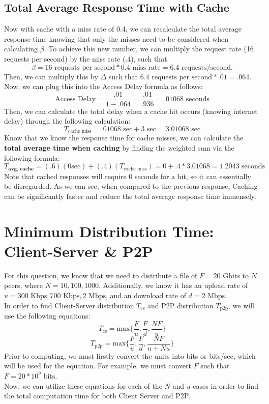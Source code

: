 \documentclass{article}
\begin{document}
\subsection{Total Average Response Time with Cache}
Now with cache with a miss rate of 0.4, we can recalculate the total average response time knowing that only the misses need to be considered when calculating $\beta$. To achieve this new number, we can multiply the request rate (16 requests per second) by the miss rate (.4), such that \
\[
\beta = 16 \text{ requests per second} * 0.4 \text{ miss rate} = 6.4 \text{ requests/second}. 
\]
Then, we can multiply this by $\Delta$ such that $6.4 \text{ requests per second} * .01 = .064$. Now, we can plug this into the Access Delay formula as follows:
\[
\text{Access Delay} = \frac{.01}{1 - .064} = \frac{.01}{.936} = .01068 \text{ seconds}
\]
Then, we can calculate the total delay when a cache hit occurs (knowing internet delay) through the following calculation:
\[
T_{\text{cache miss}} = .01068 \text{ sec}+ 3 \text{ sec} = 3.01068 \text{ sec}
\]
Know that we know the response time for cache misses, we can calculate the \textbf{total average time when caching} by finding the weighted sum via the following formula:
\[
T_{\textbf{avg, cache}} = (.6) (0 \text{sec}) + (.4) (T_{\text{cache miss}}) = 0 + .4 * 3.01068 = 1.2043 \text{ seconds}
\]
Note that cached responses will require 0 seconds for a hit, so it can essentially be disregarded. As we can see, when compared to the previous response, Caching can be significantly faster and reduce the total average response time immensely.

\setcounter{section}{21}
\section{Minimum Distribution Time: Client-Server \& P2P}
For this question, we know that we need to distribute a file of $F = 20 \text{ Gbits}$ to $N$ peers, where $N = 10, 100, 1000$. Additionally, we know it has an upload rate of $u = 300 \text{ Kbps}, 700 \text{ Kbps}, 2 \text{ Mbps}$, and an download rate of $d = 2 \text{ Mbps}$. \\
In order to find Client-Server distribution $T_{\text{cs}}$ and P2P distribution $T_{\text{p2p}}$, we will use the following equations:
\[
T_{\text{cs}} = \text{max}\{\frac{F}{u}, \frac{F}{d}, \frac{NF}{u} \} 
\]
\[
T_{\text{p2p}} = \text{max}\{\frac{F}{u}, \frac{F}{d}, \frac{NF}{u + Nu} \} 
\]
Prior to computing, we must firstly convert the units into bits or bits/sec, which will be used for the equation. For example, we must convert $F$ such that $F = 20 * 10^9 \text{ bits}$. \\
Now, we can utilize these equations for each of the $N$ and $u$ cases in order to find the total computation time for both Client Server and P2P.
\end{document}
